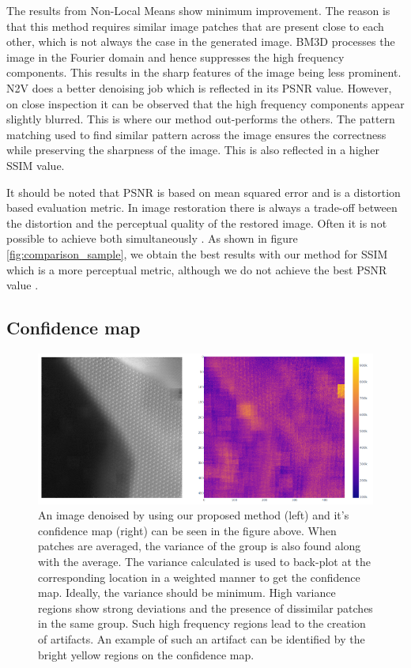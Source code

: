 \documentclass[fleqn,10pt]{wlscirep}
\begin{document}
	The results from Non-Local Means show minimum improvement. The reason is that this method requires similar image patches that are present close to each other, which is not always the case in the generated image. BM3D processes the image in the Fourier domain and hence suppresses the high frequency components. This results in the sharp features of the image being less prominent. N2V does a better denoising job which is reflected in its PSNR value. However, on close inspection it can be observed that the high frequency components appear slightly blurred. This is where our method out-performs the others. The pattern matching used to find similar pattern across the image ensures the correctness while preserving the sharpness of the image. This is also reflected in a higher SSIM value.
	
	It should be noted that PSNR is based on mean squared error and is a distortion based evaluation metric. In image restoration there is always a trade-off between the distortion and the perceptual quality of the restored image. Often it is not possible to achieve both simultaneously \cite{8578750}. As shown in figure \ref{fig:comparison_sample}, we obtain the best results with our method for SSIM which is a more perceptual metric, although we do not achieve the best PSNR value \cite{8578750}.
	
	\subsection*{Confidence map}
	
	\begin{figure}
		\centering
		\includegraphics[scale=0.7]{./imgs/confidence_map.png}
		\caption{An image denoised by using our proposed method (left) and it's confidence map (right) can be seen in the figure above. When patches are averaged, the variance of the group is also found along with the average. The variance calculated is used to back-plot at the corresponding location in a weighted manner to get the confidence map. Ideally, the variance should be minimum. High variance regions show strong deviations and the presence of dissimilar patches in the same group. Such high frequency regions lead to the creation of artifacts. An example of such an artifact can be identified by the bright yellow regions on the confidence map.}
		\label{fig:confidence_map}
	\end{figure}
	
\end{document}
